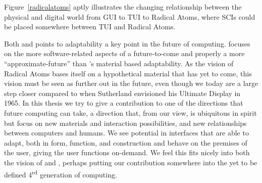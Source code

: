 Figure~\ref{radicalatoms} aptly illustrates the changing relationship between the physical and digital world from GUI to TUI to Radical Atoms, where SCIs could be placed somewhere between TUI and Radical Atoms.

Both \citeauthor{ishii2012radical} and \citeauthor{abowd2012next} points to adaptability a key point in the future of computing.
\citeauthor{abowd2012next} focuses on the more software-related aspects of a future-to-come and properly a more ``approximate-future'' than \citeauthor{ishii2012radical}'s material based adaptability.
As the vision of Radical Atoms bases itself on a hypothetical material that has yet to come, this vision must be seen as further out in the future, even though we today are a large step closer compared to when Sutherland envisioned his Ultimate Display in 1965. 
\blank
In this thesis we try to give a contribution to one of the directions that future computing can take, a direction that, from our view, is ubiquitous in spirit but focus on new materials and interaction possibilities, and new relationships between computers and humans.
We see potential in interfaces that are able to adapt, both in form, function, and construction and behave on the premises of the user, giving the user functions on-demand.
We feel this fits nicely into both the vision of \citeauthor{abowd2012next} and \citeauthor{ishii2012radical}, perhaps putting our contribution somewhere into the yet to be defined 4\textsuperscript{rd} generation of computing.